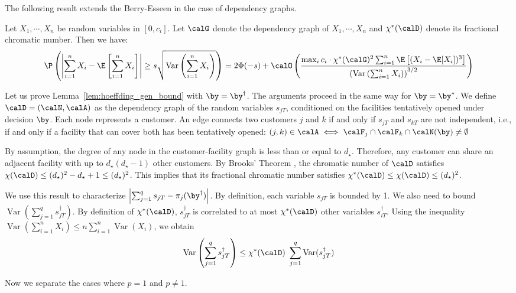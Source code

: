 \documentclass[blindrev]{informs3noheader}
\DeclareMathOperator{\Var}{Var}
\begin{document}
The following result extends the Berry-Esseen in the case of dependency graphs.
\begin{theorem}
Let $X_1,\cdots, X_n$ be random variables in $[0,c_i]$. Let $\calG$ denote the dependency graph of $X_1,\cdots, X_n$ and $\chi^*(\calD)$ denote its fractional chromatic number. Then we have:
\begin{equation*}
    \P\left(\left|\sum_{i=1}^n X_i - \E\left[\sum_{i=1}^n X_i\right]\right|\geq s \sqrt{\Var\left(\sum_{i=1}^n X_i\right)}\right)=2\Phi(-s) +\calO\left(\frac{\max_{i} c_i \cdot \chi^*(\calG)^2 \sum_{i=1}^n \E\left[(X_i-\E[X_i])^3\right]}{\left(\Var\left(\sum_{i=1}^n X_i\right)\right)^{3/2}}\right)
\end{equation*}
\end{theorem}

Let us prove Lemma~\ref{lem:hoeffding_gen_bound} with $\by = \by^\dagger$. The arguments proceed in the same way for $\by = \by^*$. We define $\calD=(\calN,\calA)$ as the dependency graph of the random variables $s_{jT}$, conditioned on the facilities tentatively opened under decision $\by$. Each node represents a customer. An edge connects two customers $j$ and $k$ if and only if $s_{jT}$ and $s_{kT}$ are not independent, i.e., if and only if a facility that can cover both has been tentatively opened: $(j,k)\in\calA\iff\calF_j\cap\calF_k\cap\calN(\by)\neq\emptyset$

By assumption, the degree of any node in the customer-facility graph is less than or equal to $d_\star$. Therefore, any customer can share an adjacent facility with up to $d_\star(d_\star-1)$ other customers.
By Brooks' Theorem \citep{brooks1941colouring}, the chromatic number of $\calD$ satisfies $\chi(\calD)\leq (d_\star)^2-d_\star+1\leq (d_\star)^2$. This implies that its fractional chromatic number satisfies $\chi^*(\calD)\leq \chi(\calD)\leq (d_\star)^2$.

We use this result to characterize $\left|\sum_{j=1}^q s_{jT} - \pi_{j}(\by^\dagger)\right|$. By definition, each variable $s_{jT}$ is bounded by 1. We also need to bound $\Var\left(\sum_{j=1}^q s^\dagger_{jT}\right)$. By definition of $\chi^*(\calD)$, $s^\dagger_{jT}$ is correlated to at most $\chi^*(\calD)$ other variables $s^\dagger_{iT}$. Using the inequality $\Var(\sum_{i=1}^n X_i)\leq n \sum_{i=1}^n \Var(X_i)$, we obtain
\[\Var\left(\sum_{j=1}^q s^\dagger_{jT}\right) \leq  \chi^*(\calD)\ \sum_{j=1}^q \Var(s^\dagger_{jT})\]

Now we separate the cases where $p=1$ and $p\neq 1$.
\end{document}
